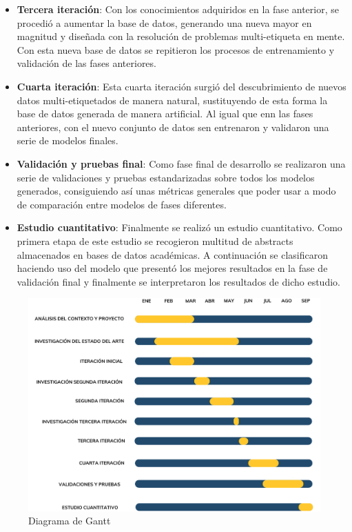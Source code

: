 \begin{itemize}
    \item \textbf{Tercera iteración}: Con los conocimientos adquiridos en la
    fase anterior, se procedió a aumentar la base de datos, generando una nueva
    mayor en magnitud y diseñada con la resolución de problemas multi-etiqueta en
    mente. Con esta nueva base de datos se repitieron los procesos de entrenamiento
    y validación de las fases anteriores.
 
    \item \textbf{Cuarta iteración}: Esta cuarta iteración surgió del
    descubrimiento de nuevos datos multi-etiquetados de manera natural,
    sustituyendo de esta forma la base de datos generada de manera artificial.
    Al igual que enn las fases anteriores, con el nuevo conjunto de datos sen
    entrenaron y validaron una serie de modelos finales.
  
    \item \textbf{Validación y pruebas final}: Como fase final de desarrollo se
    realizaron una serie de validaciones y pruebas estandarizadas sobre todos
    los modelos generados, consiguiendo así unas métricas generales que poder
    usar a modo de comparación entre modelos de fases diferentes.
 
    \item \textbf{Estudio cuantitativo}: Finalmente se realizó un estudio
    cuantitativo. Como primera etapa de este estudio se recogieron multitud de
    abstracts almacenados en bases de datos académicas. A continuación se
    clasificaron haciendo uso del modelo que presentó los mejores resultados en
    la fase de validación final y finalmente se interpretaron los resultados de
    dicho estudio.
\end{itemize}

\begin{figure}[H]
    \centering
    \includegraphics[scale= 0.5]{imagenes/1 ene - 25 MAR.pdf}
    \captionsetup{justification=centering}
    \caption{Diagrama de Gantt}
    \label{Diagrama de Gantt}
\end{figure}

